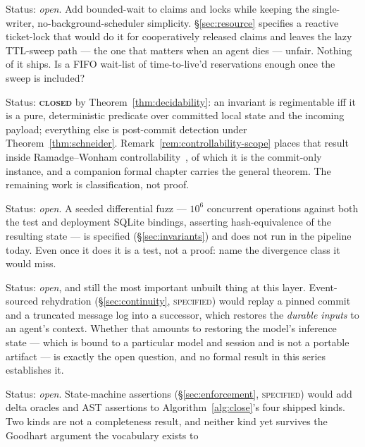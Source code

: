 \documentclass[11pt,a4paper]{article}
\newcommand{\Designed}{{\textcolor{hhgray}{\textsc{specified}}}}
\newcommand{\Closed}{{\textcolor{hhink}{\textsc{\textbf{closed}}}}}
\newcommand{\Open}{{\textcolor{hhgray}{\textit{open}}}}
\theoremstyle{definition}
\theoremstyle{remark}
\begin{document}
\begin{description}[leftmargin=2.2em,style=nextline]
\item[$\bigstar$ OP-1 --- Fair exclusion without a scheduler.] Status: \Open. Add
bounded-wait to claims and locks while keeping the single-writer,
no-background-scheduler simplicity. \S\ref{sec:resource} specifies a reactive
ticket-lock that would do it for cooperatively released claims and leaves the lazy
TTL-sweep path --- the one that matters when an agent dies --- unfair. Nothing of it
ships. Is a FIFO wait-list of time-to-live'd reservations enough once the sweep is
included?
\item[$\bigstar$ OP-2 --- Regimentation vs.\ enforcement boundary.] Status: \Closed{} by
Theorem~\ref{thm:decidability}: an invariant is regimentable iff it is a pure,
deterministic predicate over committed local state and the incoming payload;
everything else is post-commit detection under Theorem~\ref{thm:schneider}.
Remark~\ref{rem:controllability-scope} places that result inside Ramadge--Wonham
controllability~\cite{rw87,rw89}, of which it is the commit-only instance, and a
companion formal chapter carries the general theorem. The remaining work is
classification, not proof.
\item[$\bigstar$ OP-3 --- Cross-runtime soundness.] Status: \Open. A seeded differential
fuzz --- $10^6$ concurrent operations against both the test and deployment SQLite
bindings, asserting hash-equivalence of the resulting state --- is specified
(\S\ref{sec:invariants}) and does not run in the pipeline today. Even once it does
it is a test, not a proof: name the divergence class it would miss.
\item[$\bigstar$ OP-4 --- Checkpoint with teeth.] Status: \Open, and still the most
important unbuilt thing at this layer. Event-sourced rehydration
(\S\ref{sec:continuity}, \Designed) would replay a pinned commit and a truncated
message log into a successor, which restores the \emph{durable inputs} to an agent's
context. Whether that amounts to restoring the model's inference state --- which is
bound to a particular model and session and is not a portable artifact --- is
exactly the open question, and no formal result in this series establishes it.
\item[$\bigstar$ OP-5 --- Oracle completeness.] Status: \Open. State-machine assertions
(\S\ref{sec:enforcement}, \Designed) would add delta oracles and AST assertions to
Algorithm~\ref{alg:close}'s four shipped kinds. Two kinds are not a completeness
result, and neither kind yet survives the Goodhart argument the vocabulary exists to

\end{description}
\end{document}

